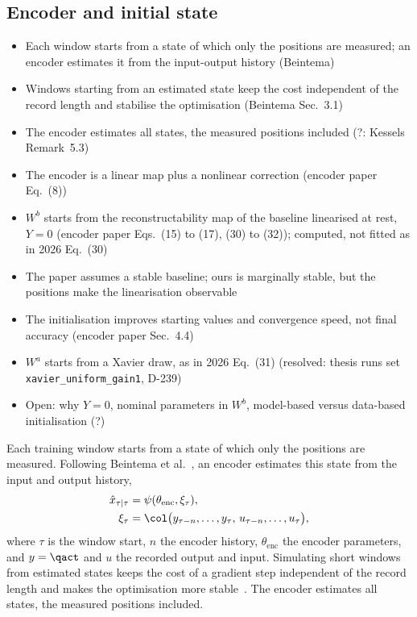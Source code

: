 \subsection{Encoder and initial state}\label{sec:aug_encoder}
\ifdraft
\begin{itemize}
\item Each window starts from a state of which only the positions are measured; an encoder estimates it from the input-output history (Beintema)
\item Windows starting from an estimated state keep the cost independent of the record length and stabilise the optimisation (Beintema Sec.~3.1)
\item The encoder estimates all states, the measured positions included (?: Kessels Remark~5.3)
\item The encoder is a linear map plus a nonlinear correction (encoder paper Eq.~(8))
\item $W^b$ starts from the reconstructability map of the baseline linearised at rest, $Y=0$ (encoder paper Eqs.~(15) to (17), (30) to (32)); computed, not fitted as in 2026 Eq.~(30)
\item The paper assumes a stable baseline; ours is marginally stable, but the positions make the linearisation observable
\item The initialisation improves starting values and convergence speed, not final accuracy (encoder paper Sec.~4.4)
\item $W^a$ starts from a Xavier draw, as in 2026 Eq.~(31) (resolved: thesis runs set \texttt{xavier\_uniform\_gain1}, D-239)
\item Open: why $Y=0$, nominal parameters in $W^b$, model-based versus data-based initialisation (?)
\end{itemize}
\fi

Each training window starts from a state of which only the positions are
measured.
Following Beintema et al.~\cite{beintema2023subnet}, an encoder estimates this
state from the input and output history,
\begin{equation}
\begin{aligned}
 \hat x_{\tau|\tau}
 &=\psi(\theta_{\mathrm{enc}},\xi_\tau),\\
 \xi_\tau&=\col\bigl(y_{\tau-n},\dots,y_\tau,\,u_{\tau-n},\dots,u_\tau\bigr),
\end{aligned}
 \label{eq:aug_encoder}
\end{equation}
where $\tau$ is the window start, $n$ the encoder history,
$\theta_{\mathrm{enc}}$ the encoder parameters, and $y=\qact$ and $u$ the
recorded output and input.
Simulating short windows from estimated states keeps the cost of a gradient
step independent of the record length and makes the optimisation more
stable~\cite[Sec.~3]{beintema2023subnet}.
The encoder estimates all states, the measured positions included.

